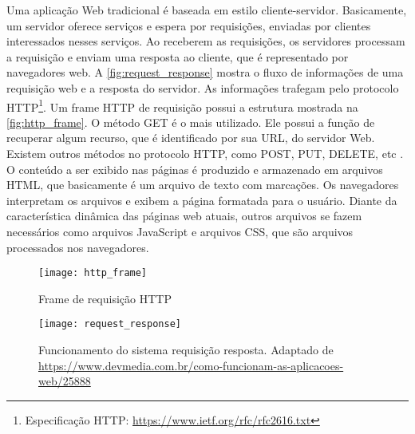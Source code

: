 		Uma aplicação Web tradicional é baseada em estilo cliente-servidor. Basicamente, um servidor oferece serviços e espera por requisições, enviadas por clientes interessados nesses serviços. Ao receberem as requisições, os servidores processam a requisição e enviam uma resposta ao cliente, que é representado por navegadores web. A \autoref{fig:request_response} mostra o fluxo de informações de uma requisição web e a resposta do servidor. As informações trafegam pelo protocolo HTTP\footnote{Especificação HTTP: \url{https://www.ietf.org/rfc/rfc2616.txt}}. Um frame HTTP de requisição possui a estrutura mostrada na \autoref{fig:http_frame}. O método GET é o mais utilizado. Ele possui a função de recuperar algum recurso, que é identificado por sua URL, do servidor Web. Existem outros métodos no protocolo HTTP, como POST, PUT, DELETE, etc \cite{diego2016}. O conteúdo a ser exibido nas páginas é produzido e armazenado em arquivos HTML, que basicamente é um arquivo de texto com marcações. Os navegadores interpretam os arquivos e exibem a página formatada para o usuário. Diante da característica dinâmica das páginas web atuais, outros arquivos se fazem necessários como arquivos JavaScript e arquivos CSS, que são arquivos processados nos navegadores.
		
		\begin{figure}[!htb]	
			\captionsetup{justification=centering}
			\begin{center}
				\texttt{[image: http\_frame]}  %
				\caption[Frame de requisição HTTP]{\label{fig:http_frame} Frame de requisição HTTP}
			\end{center}		
		\end{figure}
	
		\begin{figure}[!htb]	
			\captionsetup{justification=centering}
			\begin{center}
				\texttt{[image: request\_response]}  %
				\caption[Funcionamento do sistema requisição resposta.]{\label{fig:request_response} Funcionamento do sistema requisição resposta. Adaptado de \url{https://www.devmedia.com.br/como-funcionam-as-aplicacoes-web/25888}}
			\end{center}		
		\end{figure}
		
